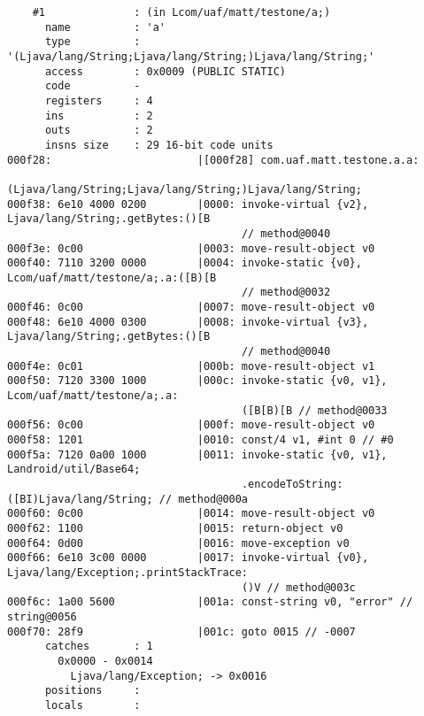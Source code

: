 \begin{lstlisting}
    #1              : (in Lcom/uaf/matt/testone/a;)
      name          : 'a'
      type          : '(Ljava/lang/String;Ljava/lang/String;)Ljava/lang/String;'
      access        : 0x0009 (PUBLIC STATIC)
      code          -
      registers     : 4
      ins           : 2
      outs          : 2
      insns size    : 29 16-bit code units
000f28:                       |[000f28] com.uaf.matt.testone.a.a:
                                        (Ljava/lang/String;Ljava/lang/String;)Ljava/lang/String;
000f38: 6e10 4000 0200        |0000: invoke-virtual {v2}, Ljava/lang/String;.getBytes:()[B
                                     // method@0040
000f3e: 0c00                  |0003: move-result-object v0
000f40: 7110 3200 0000        |0004: invoke-static {v0}, Lcom/uaf/matt/testone/a;.a:([B)[B
                                     // method@0032
000f46: 0c00                  |0007: move-result-object v0
000f48: 6e10 4000 0300        |0008: invoke-virtual {v3}, Ljava/lang/String;.getBytes:()[B
                                     // method@0040
000f4e: 0c01                  |000b: move-result-object v1
000f50: 7120 3300 1000        |000c: invoke-static {v0, v1}, Lcom/uaf/matt/testone/a;.a:
                                     ([B[B)[B // method@0033
000f56: 0c00                  |000f: move-result-object v0
000f58: 1201                  |0010: const/4 v1, #int 0 // #0
000f5a: 7120 0a00 1000        |0011: invoke-static {v0, v1}, Landroid/util/Base64;
                                     .encodeToString:([BI)Ljava/lang/String; // method@000a
000f60: 0c00                  |0014: move-result-object v0
000f62: 1100                  |0015: return-object v0
000f64: 0d00                  |0016: move-exception v0
000f66: 6e10 3c00 0000        |0017: invoke-virtual {v0}, Ljava/lang/Exception;.printStackTrace:
                                     ()V // method@003c
000f6c: 1a00 5600             |001a: const-string v0, "error" // string@0056
000f70: 28f9                  |001c: goto 0015 // -0007
      catches       : 1
        0x0000 - 0x0014
          Ljava/lang/Exception; -> 0x0016
      positions     :
      locals        :


\end{lstlisting}
